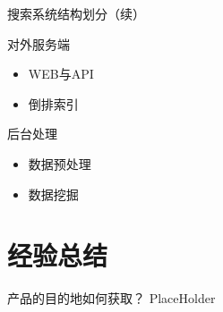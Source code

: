 \documentclass{beamer}
\begin{document}
\begin{CJK}{UTF8}{gbsn}
\begin{frame}{搜索系统结构划分（续）}
  \begin{block}{对外服务端}
    \begin{itemize}
    \item { WEB与API }
    \item { 倒排索引 }
    \end{itemize}
  \end{block}
  \begin{block}{后台处理}
    \begin{itemize}
    \item { 数据预处理 }
    \item { 数据挖掘 }
    \end{itemize}
  \end{block}
\end{frame}

\section{经验总结}

\begin{frame}{产品的目的地如何获取？}
  PlaceHolder
\end{frame}


\end{CJK}
\end{document}
